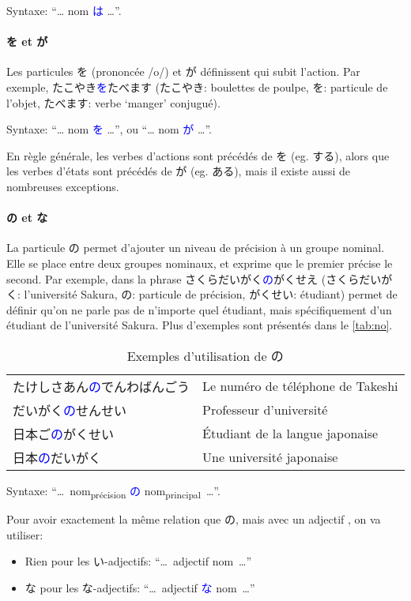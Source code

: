 \documentclass[a4paper,10pt,french,openany]{memoir}
\newcommand{\term}[1]{\textcolor{blue}{#1}}
\begin{document}
Syntaxe: ``… nom \term{は} …''.

\paragraph{を et が}
Les particules を (prononcée /o/) et が définissent qui subit l'action. Par exemple, たこやき\term{を}たべます (たこやき: boulettes de poulpe, を: particule de l'objet, たべます: verbe `manger' conjugué).

Syntaxe: ``… nom \term{を} …'', ou ``… nom \term{が} …''.

En règle générale, les verbes d'actions sont précédés de を (eg. する), alors que les verbes d'états sont précédés de が (eg. ある), mais il existe aussi de nombreuses exceptions.

\paragraph{の et な}
La particule の permet d'ajouter un niveau de précision à un groupe nominal. Elle se place entre deux groupes nominaux, et exprime que le premier précise le second. Par exemple, dans la phrase さくらだいがく\term{の}がくせえ (さくらだいがく: l'université Sakura, の: particule de précision, がくせい: étudiant) permet de définir qu'on ne parle pas de n'importe quel étudiant, mais spécifiquement d'un étudiant de l'université Sakura. Plus d'exemples sont présentés dans le \autoref{tab:no}.

\begin{table}[htbp]
 \centering
 \caption{Exemples d'utilisation de の}
 \label{tab:no}
 \begin{tabular}{ll}
  たけしさあん\term{の}でんわばんごう & Le numéro de téléphone de Takeshi \\
  だいがく\term{の}せんせい & Professeur d'université \\
  日本ご\term{の}がくせい & Étudiant de la langue japonaise \\
  日本\term{の}だいがく & Une université japonaise
 \end{tabular}
\end{table}

Syntaxe: ``…~nom\textsubscript{précision} \term{の} nom\textsubscript{principal}~…''.

Pour avoir exactement la même relation que の, mais avec un adjectif , on va utiliser:
\begin{itemize}
 \item Rien pour les い-adjectifs: ``…~adjectif nom~…''
 \item な pour les な-adjectifs: ``…~adjectif \term{な} nom~…''
\end{itemize}
\end{document}
